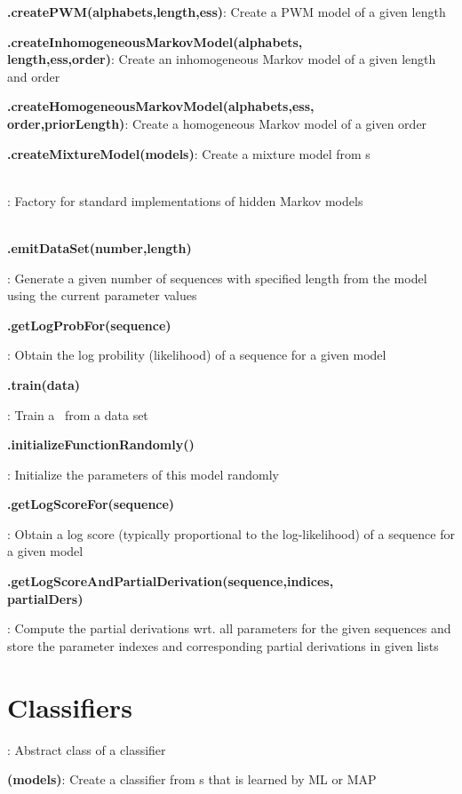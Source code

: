 \documentclass[10pt]{scrartcl}
\newcommand{\entry}[3]{{\item[]\bfseries #1#2}: #3}
\newcommand{\entrys}[3]{\item[\emph{static}] {\bfseries {#1#2}}: #3}
\newcommand{\entryn}[3]{\item[new] {\bfseries {#1#2}}: #3}
\newcommand{\sep}{\\~\vspace{-0.1cm}}
\begin{document}
\begin{flushleft}
\begin{itemize*}
\entrys{\DiffSMFactory}{.createPWM(alphabets,length,ess)}{Create a PWM model of a given length}

\entrys{\DiffSMFactory}{.createInhomogeneousMarkovModel(alphabets,\\length,ess,order)}{Create an inhomogeneous Markov model of a given length and order}

\entrys{\DiffSMFactory}{.createHomogeneousMarkovModel(alphabets,ess,\\order,priorLength)}{Create a homogeneous Markov model of a given order}

\entrys{\DiffSMFactory}{.createMixtureModel(models)}{Create a mixture model from \DiffSM s}\sep

\entry{\HMMFactory}{}{Factory for standard implementations of hidden Markov models}\sep

\entry{\StatMod}{.emitDataSet(number,length)}{Generate a given number of sequences with specified length from the model using the current parameter values}

\entry{\StatMod}{.getLogProbFor(sequence)}{Obtain the log probility (likelihood) of a sequence for a given model}

\entry{\TrainSM}{.train(data)}{Train a \TrainSM~from a data set}

\entry{\DiffSM}{.initializeFunctionRandomly()}{Initialize the parameters of this model randomly}

\entry{\DiffSM}{.getLogScoreFor(sequence)}{Obtain a log score (typically proportional to the log-likelihood) of a sequence for a given model}

\entry{\DiffSM}{.getLogScoreAndPartialDerivation(sequence,indices,\\partialDers)}{Compute the partial derivations wrt. all parameters for the given sequences and store the parameter indexes and corresponding partial derivations in given lists}

\end{itemize*}

\section{Classifiers}

\begin{itemize*}

\entry{\AbstractClassifier}{}{Abstract class of a classifier}

\entryn{\TrainSMBasedClassifier}{(models)}{Create a classifier from \TrainSM s that is learned by ML or MAP}


\end{itemize*}
\end{flushleft}
\end{document}
